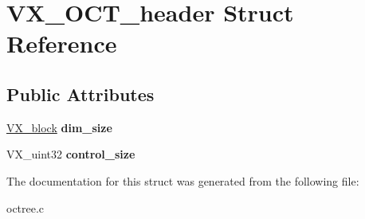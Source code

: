 \hypertarget{structVX__OCT__header}{\section{V\-X\-\_\-\-O\-C\-T\-\_\-header Struct Reference}
\label{structVX__OCT__header}
}
\subsection*{Public Attributes}
\begin{DoxyCompactItemize}
\item 
\hypertarget{structVX__OCT__header_af166f48e02f6a5b52079b7e9c1ba2a90}{\hyperlink{structVX__block}{V\-X\-\_\-block} {\bfseries dim\-\_\-size}}\label{structVX__OCT__header_af166f48e02f6a5b52079b7e9c1ba2a90}

\item 
\hypertarget{structVX__OCT__header_a0e55b18d79fccc4edb4cbf326ac1494a}{V\-X\-\_\-uint32 {\bfseries control\-\_\-size}}\label{structVX__OCT__header_a0e55b18d79fccc4edb4cbf326ac1494a}

\end{DoxyCompactItemize}


The documentation for this struct was generated from the following file\-:\begin{DoxyCompactItemize}
\item 
octree.\-c\end{DoxyCompactItemize}
